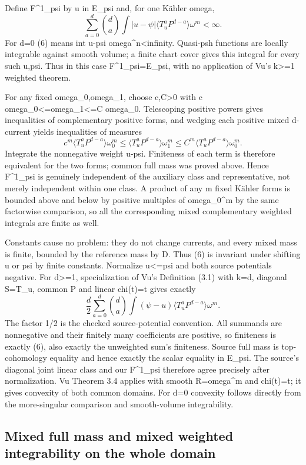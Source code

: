 \documentclass[
]{article}
\begin{document}
Define F\^{}1\_psi by u in E\_psi and, for one Kähler omega, \[
\sum_{a=0}^d\binom da\int|u-\psi|
\langle T_u^aP^{d-a}\rangle\omega^m<\infty.\tag{6}
\] For d=0 (6) means int \textbar u-psi\textbar{}
omega\^{}n\textless infinity. Quasi-psh functions are locally integrable
against smooth volume; a finite chart cover gives this integral for
every such u,psi. Thus in this case F\^{}1\_psi=E\_psi, with no
application of Vu's k\textgreater=1 weighted theorem.

For any fixed omega\_0,omega\_1, choose c,C\textgreater0 with c
omega\_0\textless=omega\_1\textless=C omega\_0. Telescoping positive
powers gives inequalities of complementary positive forms, and wedging
each positive mixed d-current yields inequalities of measures \[
c^m\langle T_u^aP^{d-a}\rangle\omega_0^m
\leq\langle T_u^aP^{d-a}\rangle\omega_1^m
\leq C^m\langle T_u^aP^{d-a}\rangle\omega_0^m.
\] Integrate the nonnegative weight \textbar u-psi\textbar. Finiteness
of each term is therefore equivalent for the two forms; common full mass
was proved above. Hence F\^{}1\_psi is genuinely independent of the
auxiliary class and representative, not merely independent within one
class. A product of any m fixed Kähler forms is bounded above and below
by positive multiples of omega\_0\^{}m by the same factorwise
comparison, so all the corresponding mixed complementary weighted
integrals are finite as well.

Constants cause no problem: they do not change currents, and every mixed
mass is finite, bounded by the reference mass by D. Thus (6) is
invariant under shifting u or psi by finite constants. Normalize
u\textless=psi and both source potentials negative. For d\textgreater=1,
specialization of Vu's Definition (3.1) with k=d, diagonal S=T\_u,
common P and linear chi(t)=t gives exactly \[
\frac d2\sum_{a=0}^d\binom da\int(\psi-u)
\langle T_u^aP^{d-a}\rangle\omega^m.
\] The factor 1/2 is the checked source-potential convention. All
summands are nonnegative and their finitely many coefficients are
positive, so finiteness is exactly (6), also exactly the unweighted
sum's finiteness. Source full mass is top-cohomology equality and hence
exactly the scalar equality in E\_psi. The source's diagonal joint
linear class and our F\^{}1\_psi therefore agree precisely after
normalization. Vu Theorem 3.4 applies with smooth R=omega\^{}m and
chi(t)=t; it gives convexity of both common domains. For d=0 convexity
follows directly from the more-singular comparison and smooth-volume
integrability.

\subsection{Mixed full mass and mixed weighted integrability on the
whole
domain}\label{mixed-full-mass-and-mixed-weighted-integrability-on-the-whole-domain}
\end{document}
